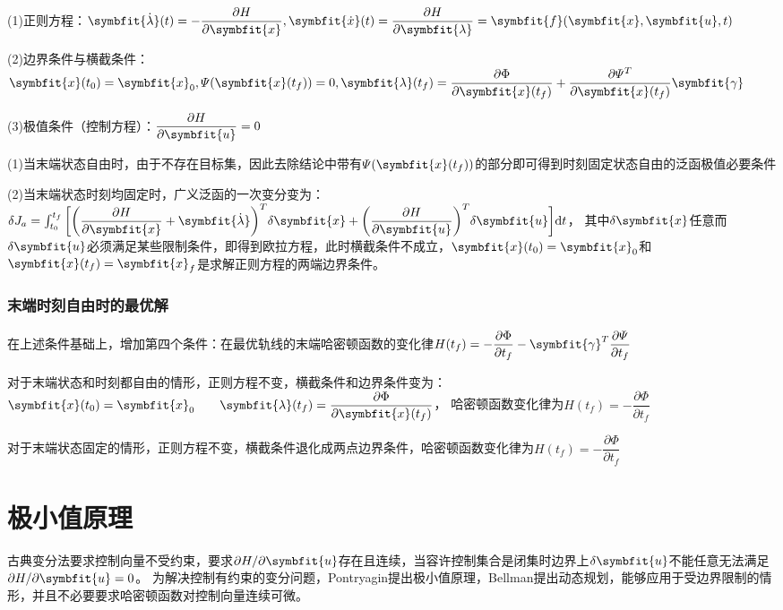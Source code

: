 \documentclass[11pt,a4paper]{ctexart}
\renewcommand{\d}{{\rm d}}
\newcommand{\bm}{\symbfit}
\begin{document}
            (1)正则方程：$\bm{\dot\lambda}(t)=-\dfrac{\partial H}{\partial\bm{x}},\bm{\dot x}(t)=\dfrac{\partial H}{\partial\bm{\lambda}}=\bm{f}(\bm{x},\bm{u},t)$
            
            (2)边界条件与横截条件：$\bm{x}(t_0)=\bm{x}_0,\varPsi(\bm{x}(t_f))=0,\bm{\lambda}(t_f)=\dfrac{\partial\Phi}{\partial\bm{x}(t_f)}+\dfrac{\partial\varPsi^T}{\partial\bm{x}(t_f)}\bm{\gamma}$
            
            (3)极值条件（控制方程）：$\dfrac{\partial H}{\partial\bm{u}}=0$

            (1)当末端状态自由时，由于不存在目标集，因此去除结论中带有$\varPsi(\bm{x}(t_f))$的部分即可得到时刻固定状态自由的泛函极值必要条件
            
            (2)当末端状态时刻均固定时，广义泛函的一次变分变为：$\delta J_a=\int_{t_0}^{t_f}\bigg[\bigg(\dfrac{\partial H}{\partial\bm{x}}+\bm{\dot\lambda}\bigg)^T\delta\bm{x}
            +\bigg(\dfrac{\partial H}{\partial\bm{u}}\bigg)^T\delta\bm{u}\bigg]\d t$，
            其中$\delta\bm{x}$任意而$\delta\bm{u}$必须满足某些限制条件，即得到欧拉方程，此时横截条件不成立，$\bm{x}(t_0)=\bm{x}_0$和$\bm{x}(t_f)=\bm{x}_f$是求解正则方程的两端边界条件。
        \subsubsection{末端时刻自由时的最优解}
            在上述条件基础上，增加第四个条件：在最优轨线的末端哈密顿函数的变化律$H(t_f)=-\dfrac{\partial\Phi}{\partial t_f}-\bm{\gamma}^T\dfrac{\partial\varPsi}{\partial t_f}$

            对于末端状态和时刻都自由的情形，正则方程不变，横截条件和边界条件变为：$\bm{x}(t_0)=\bm{x}_0\qquad\bm{\lambda}(t_f)=\dfrac{\partial\Phi}{\partial\bm{x}(t_f)}$，
            哈密顿函数变化律为$H(t_f)=-\dfrac{\partial\Phi}{\partial t_f}$
            
            对于末端状态固定的情形，正则方程不变，横截条件退化成两点边界条件，哈密顿函数变化律为$H(t_f)=-\dfrac{\partial\Phi}{\partial t_f}$
\newpage
\section{极小值原理}
    古典变分法要求控制向量不受约束，要求$\partial H/\partial\bm{u}$存在且连续，当容许控制集合是闭集时边界上$\delta\bm{u}$不能任意无法满足$\partial H/\partial\bm{u}=0$。
    为解决控制有约束的变分问题，Pontryagin提出极小值原理，Bellman提出动态规划，能够应用于受边界限制的情形，并且不必要要求哈密顿函数对控制向量连续可微。
\end{document}
